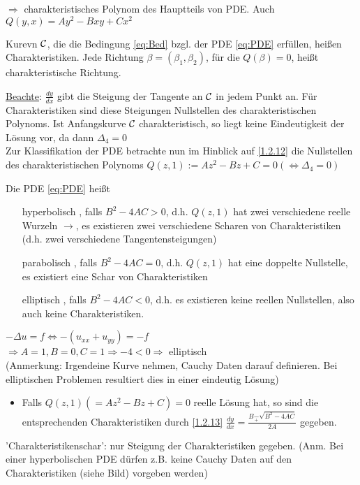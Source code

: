 $\Rightarrow$ charakteristisches Polynom des Hauptteils von PDE. Auch $Q(y,x) = Ay^2-Bxy +Cx^2$

\begin{definition}
    Kurevn $\mathcal{C}$, die die Bedingung \eqref{eq:Bed} bzgl. der PDE \eqref{eq:PDE} erfüllen, heißen Charakteristiken. Jede Richtung $\beta = (\beta_1,\beta_2)$, für die $Q(\beta)=0$, heißt charakteristische Richtung.
\end{definition}

\underline{Beachte}: $\frac{dy}{dx}$ gibt die Steigung der Tangente an $\mathcal{C}$ in jedem Punkt an. Für Charakteristiken sind diese Steigungen Nullstellen des charakteristischen Polynoms. Ist Anfangskurve $\mathcal{C}$ charakteristisch, so liegt keine Eindeutigkeit der Lösung vor, da dann $\Delta_4 = 0$\\

Zur Klassifikation der PDE betrachte nun im Hinblick auf \ref{1.2.12} die Nullstellen des charakteristischen Polynoms $Q(z,1) := Az^2 - Bz + C = 0 (\Leftrightarrow \Delta_4 = 0) $

Die PDE \eqref{eq:PDE} heißt 
\begin{itemize}
    \item[hyperbolisch], falls $B^2-4AC > 0$, d.h. $Q(z,1)$ hat zwei verschiedene reelle Wurzeln $\to$, es existieren zwei verschiedene Scharen von Charakteristiken (d.h. zwei verschiedene Tangentensteigungen)
    \item[parabolisch], falls $B^2-4AC = 0$, d.h. $Q(z,1)$ hat eine doppelte Nullstelle, es existiert eine Schar von Charakteristiken
    \item[elliptisch], falls $B^2-4AC < 0$, d.h. es existieren keine reellen Nullstellen, also auch keine Charakteristiken.
\end{itemize}

\begin{beispiel}
    $-\Delta u =f \Leftrightarrow -(u_{xx} + u_{yy}) = -f$\\
    $\Rightarrow A=1, B=0, C=1 \Rightarrow -4 < 0 \Rightarrow $ elliptisch\\
    (Anmerkung: Irgendeine Kurve nehmen, Cauchy Daten darauf definieren. Bei elliptischen Problemen resultiert dies in einer eindeutig Lösung)
\end{beispiel}

\begin{itemize}
    \item Falls $Q(z,1)\left( =Az^2-Bz+C \right) = 0$ reelle Lösung hat, so sind die entsprechenden Charakteristiken durch \ref{1.2.13} $\frac{dy}{dx} = \frac{B \underset{+}{-} \sqrt{B^2-4AC}}{2A}$ gegeben.
\end{itemize}

'Charakteristikenschar': nur Steigung der Charakteristiken gegeben. (Anm. Bei einer hyperbolischen PDE dürfen z.B. keine Cauchy Daten auf den Charakteristiken (siehe Bild) vorgeben werden)


